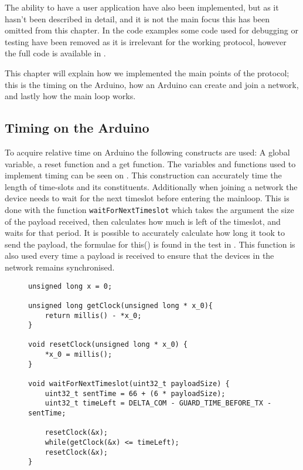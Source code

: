 \noindent
The ability to have a user application have also been implemented, but as it hasn't been described in detail, and it is not the main focus this has been omitted from this chapter.
In the code examples some code used for debugging or testing have been removed as it is irrelevant for the working protocol, however the full code is available in . 

This chapter will explain how we implemented the main points of the protocol; this is the timing on the Arduino, how an Arduino can create and join a network, and lastly how the main loop works. 

\subsection{Timing on the Arduino}
To acquire relative time on Arduino the following constructs are used: A global variable, a reset function and a get function.
The variables and functions used to implement timing can be seen on .
This construction can accurately time the length of time-slots and its constituents. 
Additionally when joining a network the device needs to wait for the next timeslot before entering the mainloop. 
This is done with the function \texttt{waitForNextTimeslot} which takes the argument the size of the payload received, then calculates how much is left of the timeslot, and waits for that period. 
It is possible to accurately calculate how long it took to send the payload, the formulae for this() is found in the test in .
This function is also used every time a payload is received to ensure that the devices in the network remains synchronised. 

\begin{figure}
\begin{lstlisting}[style=customc,caption={The variables and functions used to implement timing.},label={lst:ccrc:timing}]
unsigned long x = 0;

unsigned long getClock(unsigned long * x_0){
    return millis() - *x_0;
}

void resetClock(unsigned long * x_0) {
    *x_0 = millis();
}

void waitForNextTimeslot(uint32_t payloadSize) {
    uint32_t sentTime = 66 + (6 * payloadSize);
    uint32_t timeLeft = DELTA_COM - GUARD_TIME_BEFORE_TX - sentTime;

    resetClock(&x);
    while(getClock(&x) <= timeLeft);
    resetClock(&x);
}

\end{lstlisting}
\vspace{-20pt}
\end{figure}

